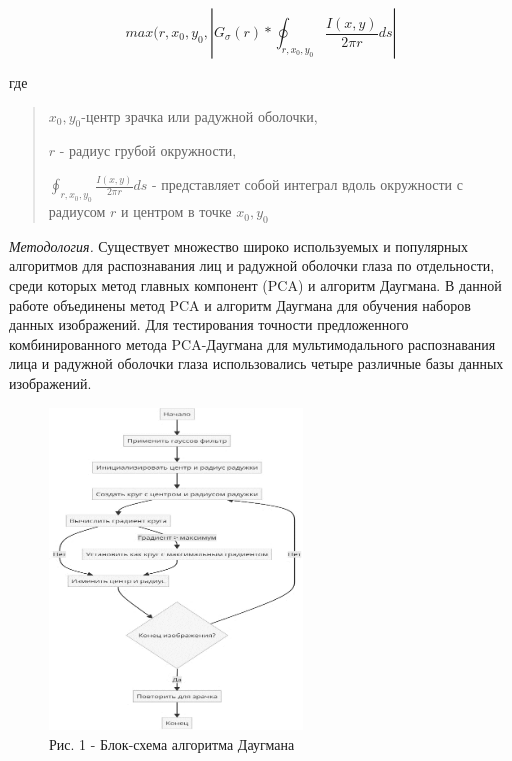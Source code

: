 \[max(r,x_{0},y_{0},\left| G_{\sigma}(r)*\oint_{r,x_{0},y_{0}}\frac{I(x,y)}{2\pi r}ds \right|\]

\begin{multicols}{2}
где

\begin{quote}
\(x_{0},y_{0}\)-центр зрачка или радужной оболочки,

\(r\) - радиус грубой окружности,

\(\oint_{r,x_{0},y_{0}}\frac{I(x,y)}{2\pi r}ds\) - представляет собой
интеграл вдоль окружности с радиусом \(r\) и центром в точке
\(x_{0},y_{0}\)
\end{quote}

\emph{Методология.} Существует множество широко используемых и
популярных алгоритмов для распознавания лиц и радужной оболочки глаза по
отдельности, среди которых метод главных компонент (PCA) и алгоритм
Даугмана. В данной работе объединены метод PCA и алгоритм Даугмана для
обучения наборов данных изображений. Для тестирования точности
предложенного комбинированного метода PCA-Даугмана для мультимодального
распознавания лица и радужной оболочки глаза использовались четыре
различные базы данных изображений.
\end{multicols}

\begin{figure}[H]
	\centering
	\includegraphics[width=0.6\textwidth]{assets/83}
	\caption*{Рис. 1 - Блок-схема алгоритма Даугмана}
\end{figure}

